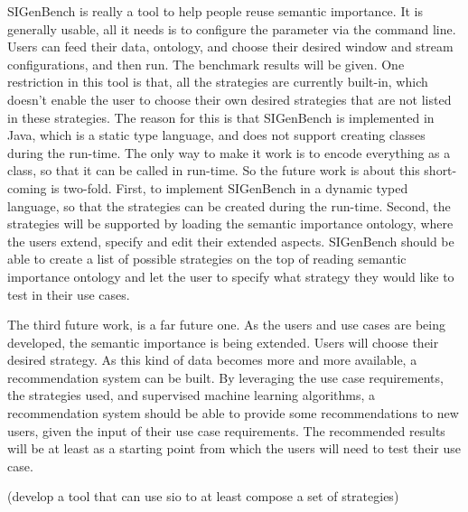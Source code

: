 SIGenBench is really a tool to help people reuse semantic importance.
It is generally usable, all it needs is to configure the parameter via the command line. 
Users can feed their data, ontology, and choose their desired window and stream configurations, and then run. 
The benchmark results will be given.
One restriction in this tool is that, all the strategies are currently built-in, which doesn't enable the user to choose their own desired strategies that are not listed in these strategies. 
The reason for this is that SIGenBench is implemented in Java, which is a static type language, and does not support creating classes during the run-time. 
The only way to make it work is to encode everything as a class, so that it can be called in run-time. 
So the future work is about this short-coming is two-fold.
First, to implement SIGenBench in a dynamic typed language, so that the strategies can be created during the run-time.
Second, the strategies will be supported by loading the semantic importance ontology, where the users extend, specify and edit their extended aspects.
SIGenBench should be able to create a list of possible strategies on the top of reading semantic importance ontology and let the user to specify what strategy they would like to test in their use cases. 

The third future work, is a far future one. 
As the users and use cases are being developed, the semantic importance is being extended. 
Users will choose their desired strategy. 
As this kind of data becomes more and more available, a recommendation system can be built. 
By leveraging the use case requirements, the strategies used, and supervised machine learning algorithms, a recommendation system should be able to provide some recommendations to new users, given the input of their use case requirements. 
The recommended results will be at least as a starting point from which the users will need to test their use case. 

(develop a tool that can use sio to at least compose a set of strategies)